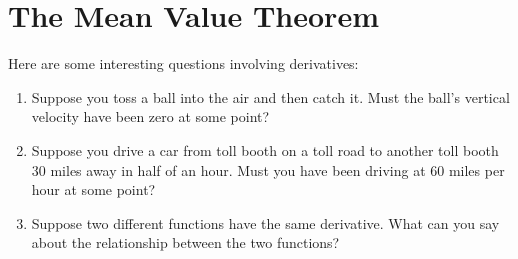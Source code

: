 \begin{exercises}
%  
%  
%  
%  
%  
%  

\end{exercises}











\section{The Mean Value Theorem}

Here are some  interesting questions involving derivatives:

\begin{enumerate}
\item Suppose you toss a ball into the air and then catch it. Must the
  ball's vertical velocity have been zero at some point?
\item Suppose you drive a car from toll booth on a toll road to
  another toll booth $30$ miles away in half of an hour. Must you have
  been driving at $60$ miles per hour at some point?
\item Suppose two different functions have the same derivative. What
  can you say about the relationship between the two functions?
\end{enumerate}

